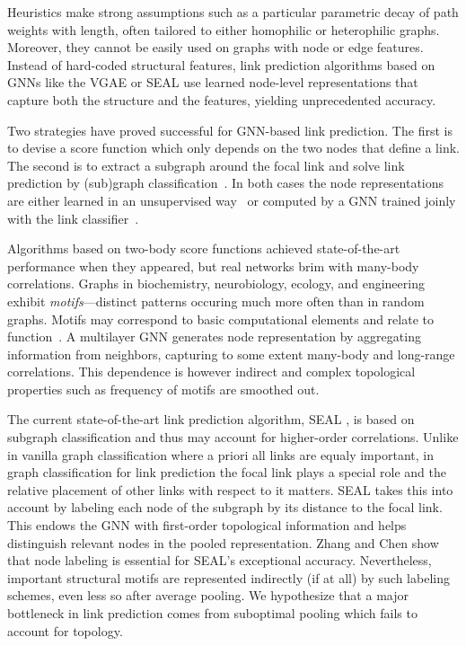 \documentclass[11pt]{article}
\begin{document}
Heuristics make strong assumptions such as a particular parametric decay of path weights with length, often tailored to either homophilic or heterophilic graphs. Moreover, they cannot be easily used on graphs with node or edge features. Instead of hard-coded structural features, link prediction algorithms based on GNNs like the VGAE \citep{kipf2016variational} or SEAL \cite{zhang2018link} use learned node-level representations that capture both the structure and the features, yielding unprecedented accuracy. 

Two strategies have proved successful for GNN-based link prediction. The first is to devise a score function which only depends on the two nodes that define a link. The second is to extract a subgraph around the focal link and solve link prediction by (sub)graph classification~\citep{zhang2017weisfeiler}. In both cases the node representations are either learned in an unsupervised way~\citep{kipf2016variational,mavromatis2020graph} or computed by a GNN trained joinly with the link classifier~\citep{zhang2018link,zhang2020revisiting}. 

Algorithms based on two-body score functions achieved state-of-the-art performance when they appeared, 
but real networks brim with many-body correlations. Graphs in biochemistry, neurobiology, ecology, and engineering~\citep{milo2004superfamilies} exhibit \emph{motifs}---distinct patterns occuring much more often than in random graphs. Motifs may correspond to basic computational elements and relate to function~\citep{shen2002network}. A multilayer GNN generates node representation by aggregating information from neighbors, capturing to some extent many-body and long-range correlations. This dependence is however indirect and complex topological properties such as frequency of motifs are smoothed out.



The current state-of-the-art link prediction algorithm, SEAL \citep{zhang2018link}, is based on subgraph classification and thus may account for higher-order correlations. Unlike in vanilla graph classification where a priori all links are equaly important, in graph classification for link prediction the focal link plays a special role and the relative placement of other links with respect to it matters. SEAL takes this into account by labeling each node of the subgraph by its distance to the focal link. This endows the GNN with first-order topological information and helps distinguish relevant nodes in the pooled representation. Zhang and Chen show that node labeling is essential for SEAL's exceptional accuracy. Nevertheless, important structural motifs are represented indirectly (if at all) by such labeling schemes, even less so after average pooling. We hypothesize that a major bottleneck in link prediction comes from suboptimal pooling which fails to account for topology.
\vspace{-1mm}
\end{document}

